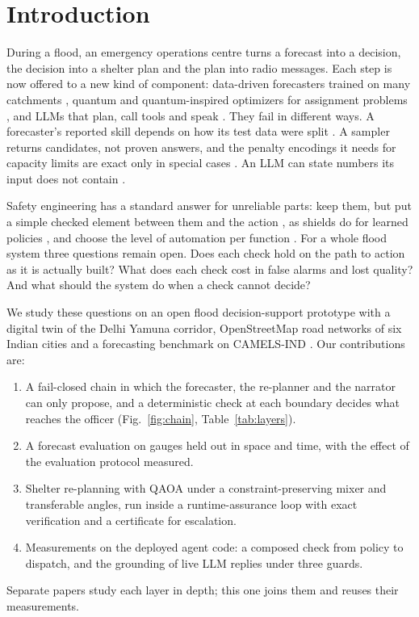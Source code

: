 \documentclass[conference]{IEEEtran}
\begin{document}
\section{Introduction}
During a flood, an emergency operations centre turns a forecast into a decision, the decision into a shelter plan and the plan into radio messages. Each step is now offered to a new kind of component: data-driven forecasters trained on many catchments \cite{Kratzert2019a,Nearing2024}, quantum and quantum-inspired optimizers for assignment problems \cite{Lucas2014,Abbas2024,Cadelina2024}, and LLMs that plan, call tools and speak \cite{Yao2023}. They fail in different ways. A forecaster's reported skill depends on how its test data were split \cite{Kapoor2023,Roberts2017}. A sampler returns candidates, not proven answers, and the penalty encodings it needs for capacity limits are exact only in special cases \cite{Glover2019}. An LLM can state numbers its input does not contain \cite{Ji2023}.

Safety engineering has a standard answer for unreliable parts: keep them, but put a simple checked element between them and the action \cite{Sha2001,Desai2019}, as shields do for learned policies \cite{Alshiekh2018}, and choose the level of automation per function \cite{Parasuraman2000}. For a whole flood system three questions remain open. Does each check hold on the path to action as it is actually built? What does each check cost in false alarms and lost quality? And what should the system do when a check cannot decide?

We study these questions on an open flood decision-support prototype with a digital twin of the Delhi Yamuna corridor, OpenStreetMap road networks of six Indian cities and a forecasting benchmark on CAMELS-IND \cite{Mangukiya2025}. Our contributions are:
\begin{enumerate}
\item A fail-closed chain in which the forecaster, the re-planner and the narrator can only propose, and a deterministic check at each boundary decides what reaches the officer (Fig.~\ref{fig:chain}, Table~\ref{tab:layers}).
\item A forecast evaluation on gauges held out in space and time, with the effect of the evaluation protocol measured.
\item Shelter re-planning with QAOA under a constraint-preserving mixer and transferable angles, run inside a runtime-assurance loop with exact verification and a certificate for escalation.
\item Measurements on the deployed agent code: a composed check from policy to dispatch, and the grounding of live LLM replies under three guards.
\end{enumerate}
Separate papers study each layer in depth; this one joins them and reuses their measurements.
\end{document}
